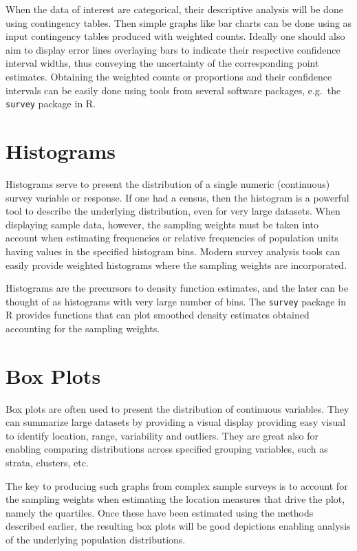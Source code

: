 \documentclass[
  12pt,
]{book}
\begin{document}
When the data of interest are categorical, their descriptive analysis will be done using contingency tables. Then simple graphs like bar charts can be done using as input contingency tables produced with weighted counts. Ideally one should also aim to display error lines overlaying bars to indicate their respective confidence interval widths, thus conveying the uncertainty of the corresponding point estimates. Obtaining the weighted counts or proportions and their confidence intervals can be easily done using tools from several software packages, e.g.~the \texttt{survey} package in R.

\hypertarget{histograms}{%
\section{Histograms}\label{histograms}}

Histograms serve to present the distribution of a single numeric (continuous) survey variable or response. If one had a census, then the histogram is a powerful tool to describe the underlying distribution, even for very large datasets. When displaying sample data, however, the sampling weights must be taken into account when estimating frequencies or relative frequencies of population units having values in the specified histogram bins. Modern survey analysis tools can easily provide weighted histograms where the sampling weights are incorporated.

Histograms are the precursors to density function estimates, and the later can be thought of as histograms with very large number of bins. The \texttt{survey} package in R provides functions that can plot smoothed density estimates obtained accounting for the sampling weights.

\hypertarget{box-plots}{%
\section{Box Plots}\label{box-plots}}

Box plots are often used to present the distribution of continuous variables. They can summarize large datasets by providing a visual display providing easy visual to identify location, range, variability and outliers. They are great also for enabling comparing distributions across specified grouping variables, such as strata, clusters, etc.

The key to producing such graphs from complex sample surveys is to account for the sampling weights when estimating the location measures that drive the plot, namely the quartiles. Once these have been estimated using the methods described earlier, the resulting box plots will be good depictions enabling analysis of the underlying population distributions.
\end{document}
